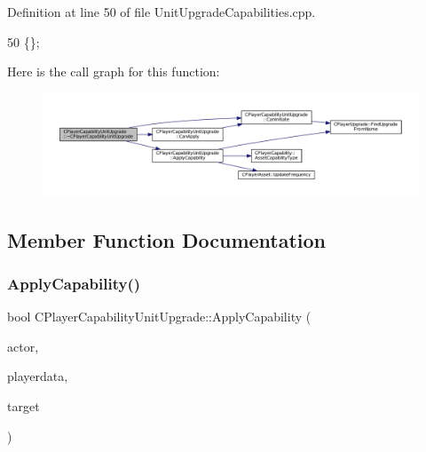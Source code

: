 Definition at line 50 of file Unit\+Upgrade\+Capabilities.\+cpp.


\begin{DoxyCode}
50 \{\};
\end{DoxyCode}
Here is the call graph for this function\+:\nopagebreak
\begin{figure}[H]
\begin{center}
\leavevmode
\includegraphics[width=350pt]{classCPlayerCapabilityUnitUpgrade_a7784e1fb92a26acb700c06ab38d2733b_cgraph}
\end{center}
\end{figure}


\subsection{Member Function Documentation}
\hypertarget{classCPlayerCapabilityUnitUpgrade_a8cc6fee17dd178fd798e36c3d5301e9d}{}\label{classCPlayerCapabilityUnitUpgrade_a8cc6fee17dd178fd798e36c3d5301e9d} 
\subsubsection{\texorpdfstring{Apply\+Capability()}{ApplyCapability()}}
{\footnotesize\ttfamily bool C\+Player\+Capability\+Unit\+Upgrade\+::\+Apply\+Capability (\begin{DoxyParamCaption}\item[{std\+::shared\+\_\+ptr$<$ \hyperlink{classCPlayerAsset}{C\+Player\+Asset} $>$}]{actor,  }\item[{std\+::shared\+\_\+ptr$<$ \hyperlink{classCPlayerData}{C\+Player\+Data} $>$}]{playerdata,  }\item[{std\+::shared\+\_\+ptr$<$ \hyperlink{classCPlayerAsset}{C\+Player\+Asset} $>$}]{target }\end{DoxyParamCaption})\hspace{0.3cm}{\ttfamily [virtual]}}



